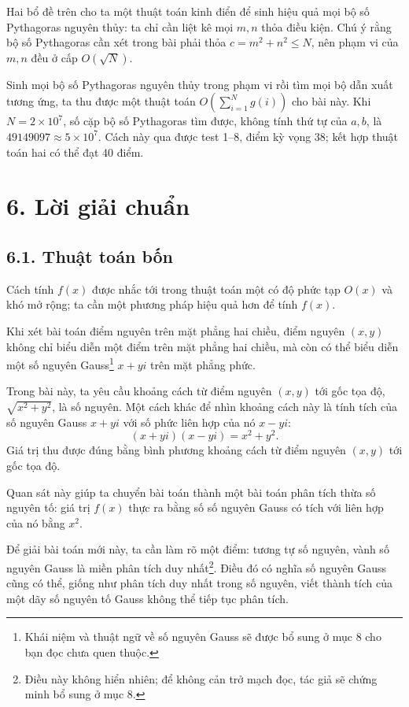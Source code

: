 \documentclass[11pt]{article}
\begin{document}
Hai bổ đề trên cho ta một thuật toán kinh điển để sinh hiệu quả mọi bộ số
Pythagoras nguyên thủy: ta chỉ cần liệt kê mọi \(m,n\) thỏa điều kiện. Chú ý
rằng bộ số Pythagoras cần xét trong bài phải thỏa \(c=m^2+n^2\le N\), nên
phạm vi của \(m,n\) đều ở cấp \(O(\sqrt N)\).

Sinh mọi bộ số Pythagoras nguyên thủy trong phạm vi rồi tìm mọi bộ dẫn xuất
tương ứng, ta thu được một thuật toán \(O(\sum_{i=1}^{N} g(i))\) cho bài này.
Khi \(N=2\times10^7\), số cặp bộ số Pythagoras tìm được, không tính thứ tự của
\(a,b\), là \(49149097\approx5\times10^7\). Cách này qua được test 1--8, điểm
kỳ vọng 38; kết hợp thuật toán hai có thể đạt 40 điểm.

\section*{6. Lời giải chuẩn}

\subsection*{6.1. Thuật toán bốn}

Cách tính \(f(x)\) được nhắc tới trong thuật toán một có độ phức tạp
\(O(x)\) và khó mở rộng; ta cần một phương pháp hiệu quả hơn để tính \(f(x)\).

Khi xét bài toán điểm nguyên trên mặt phẳng hai chiều, điểm nguyên \((x,y)\)
không chỉ biểu diễn một điểm trên mặt phẳng hai chiều, mà còn có thể biểu diễn
một số nguyên Gauss\footnote{Khái niệm và thuật ngữ về số nguyên Gauss sẽ được
bổ sung ở mục 8 cho bạn đọc chưa quen thuộc.} \(x+yi\) trên mặt phẳng phức.

Trong bài này, ta yêu cầu khoảng cách từ điểm nguyên \((x,y)\) tới gốc tọa độ,
\(\sqrt{x^2+y^2}\), là số nguyên. Một cách khác để nhìn khoảng cách này là
tính tích của số nguyên Gauss \(x+yi\) với số phức liên hợp của nó
\(x-yi\):
\[
  (x+yi)(x-yi)=x^2+y^2.
\]
Giá trị thu được đúng bằng bình phương khoảng cách từ điểm nguyên \((x,y)\)
tới gốc tọa độ.

Quan sát này giúp ta chuyển bài toán thành một bài toán phân tích thừa số
nguyên tố: giá trị \(f(x)\) thực ra bằng số số nguyên Gauss có tích với liên
hợp của nó bằng \(x^2\).

Để giải bài toán mới này, ta cần làm rõ một điểm: tương tự số nguyên, vành số
nguyên Gauss là miền phân tích duy nhất\footnote{Điều này không hiển nhiên;
để không cản trở mạch đọc, tác giả sẽ chứng minh bổ sung ở mục 8.}. Điều đó
có nghĩa số nguyên Gauss cũng có thể, giống như phân tích duy nhất trong số
nguyên, viết thành tích của một dãy số nguyên tố Gauss không thể tiếp tục phân
tích.
\end{document}
